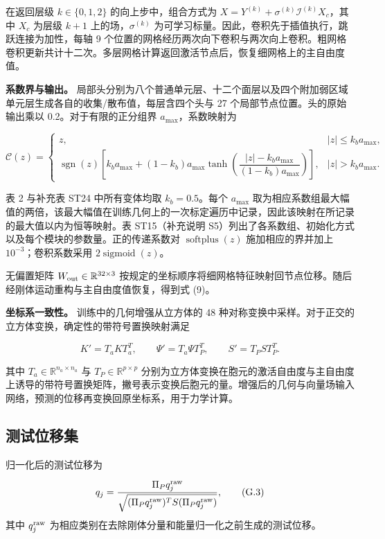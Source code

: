 \documentclass[preprint,12pt,authoryear]{elsarticle}
\begin{document}
在返回层级 \(k\in\{0,1,2\}\) 的向上步中，组合方式为 \(X=Y^{(k)}+\sigma^{(k)}\mathcal I^{(k)}X_c\)，其中 \(X_c\) 为层级 \(k+1\) 上的场，\(\sigma^{(k)}\) 为可学习标量。因此，卷积先于插值执行，跳跃连接为加性，每轴 9 个位置的网格经历两次向下卷积与两次向上卷积。粗网格卷积更新共计十二次。多层网格计算返回激活节点后，恢复细网格上的主自由度值。

\textbf{系数界与输出。} 局部头分别为八个普通单元层、十二个面层以及四个附加弱区域单元层生成各自的收集/散布值，每层含四个头与 27 个局部节点位置。头的原始输出乘以 0.2。对于有限的正分组界 \(a_{\max}\)，系数映射为

\[
\mathcal C(z)=
\begin{cases}
z,&|z|\le k_ba_{\max},\\
\operatorname{sgn}(z)\left[k_ba_{\max}+(1-k_b)a_{\max}
\tanh\!\left(\dfrac{|z|-k_ba_{\max}}{(1-k_b)a_{\max}}\right)\right],&|z|>k_ba_{\max}.
\end{cases}
\]

表 2 与补充表 ST24 中所有变体均取 \(k_b=0.5\)。每个 \(a_{\max}\) 取为相应系数组最大幅值的两倍，该最大幅值在训练几何上的一次标定遍历中记录，因此该映射在所记录的最大值以内为恒等映射。表 ST15（补充说明 S5）列出了各系数组、初始化方式以及每个模块的参数量。正的传递系数对 \(\operatorname{softplus}(z)\) 施加相应的界并加上 \(10^{-3}\)；卷积系数采用 \(2\operatorname{sigmoid}(z)\)。

无偏置矩阵 \(W_{\rm out}\in\mathbb R^{32\times3}\) 按规定的坐标顺序将细网格特征映射回节点位移。随后经刚体运动重构与主自由度值恢复，得到式 (9)。

\textbf{坐标系一致性。} 训练中的几何增强从立方体的 48 种对称变换中采样。对于正交的立方体变换，确定性的带符号置换映射满足

\[
K'=T_aKT_a^T,\qquad \Psi'=T_a\Psi T_P^T,\qquad S'=T_PST_P^T.
\tag{G.2}
\]

其中 \(T_a\in\mathbb R^{n_a\times n_a}\) 与 \(T_P\in\mathbb R^{p\times p}\) 分别为立方体变换在胞元的激活自由度与主自由度上诱导的带符号置换矩阵，撇号表示变换后胞元的量。增强后的几何与向量场输入网络，预测的位移再变换回原坐标系，用于力学计算。

\subsection{测试位移集}

归一化后的测试位移为

\[
q_j=\frac{\Pi_Pq_j^{\rm raw}}
{\sqrt{(\Pi_Pq_j^{\rm raw})^TS(\Pi_Pq_j^{\rm raw})}},
\tag{G.3}
\]
其中 \(q_j^{\rm raw}\) 为相应类别在去除刚体分量和能量归一化之前生成的测试位移。
\end{document}
